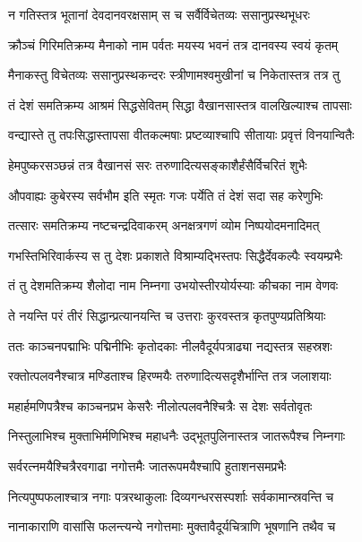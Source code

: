 \twolineshloka
{न गतिस्तत्र भूतानां देवदानवरक्षसाम्}
{स च सर्वैर्विचेतव्यः ससानुप्रस्थभूधरः} %

\twolineshloka
{क्रौञ्चं गिरिमतिक्रम्य मैनाको नाम पर्वतः}
{मयस्य भवनं तत्र दानवस्य स्वयं कृतम्} %

\twolineshloka
{मैनाकस्तु विचेतव्यः ससानुप्रस्थकन्दरः}
{स्त्रीणामश्वमुखीनां च निकेतास्तत्र तत्र तु} %

\twolineshloka
{तं देशं समतिक्रम्य आश्रमं सिद्धसेवितम्}
{सिद्धा वैखानसास्तत्र वालखिल्याश्च तापसाः} %

\twolineshloka
{वन्द्यास्ते तु तपःसिद्धास्तापसा वीतकल्मषाः}
{प्रष्टव्याश्चापि सीतायाः प्रवृत्तं विनयान्वितैः} %

\twolineshloka
{हेमपुष्करसञ्छन्नं तत्र वैखानसं सरः}
{तरुणादित्यसङ्काशैर्हंसैर्विचरितं शुभैः} %

\twolineshloka
{औपवाह्यः कुबेरस्य सर्वभौम इति स्मृतः}
{गजः पर्येति तं देशं सदा सह करेणुभिः} %

\twolineshloka
{तत्सारः समतिक्रम्य नष्टचन्द्रदिवाकरम्}
{अनक्षत्रगणं व्योम निष्पयोदमनादिमत्} %

\twolineshloka
{गभस्तिभिरिवार्कस्य स तु देशः प्रकाशते}
{विश्राम्यद्भिस्तपः सिद्धैर्देवकल्पैः स्वयम्प्रभैः} %

\twolineshloka
{तं तु देशमतिक्रम्य शैलोदा नाम निम्नगा}
{उभयोस्तीरयोर्यस्याः कीचका नाम वेणवः} %

\twolineshloka
{ते नयन्ति परं तीरं सिद्धान्प्रत्यानयन्ति च}
{उत्तराः कुरवस्तत्र कृतपुण्यप्रतिश्रियाः} %

\twolineshloka
{ततः काञ्चनपद्माभिः पद्मिनीभिः कृतोदकाः}
{नीलवैदूर्यपत्राढ्या नद्यस्तत्र सहस्रशः} %

\twolineshloka
{रक्तोत्पलवनैश्चात्र मण्डिताश्च हिरण्मयैः}
{तरुणादित्यसदृशैर्भान्ति तत्र जलाशयाः} %

\twolineshloka
{महार्हमणिपत्रैश्च काञ्चनप्रभ केसरैः}
{नीलोत्पलवनैश्चित्रैः स देशः सर्वतोवृतः} %

\twolineshloka
{निस्तुलाभिश्च मुक्ताभिर्मणिभिश्च महाधनैः}
{उद्भूतपुलिनास्तत्र जातरूपैश्च निम्नगाः} %

\twolineshloka
{सर्वरत्नमयैश्चित्रैरवगाढा नगोत्तमैः}
{जातरूपमयैश्चापि हुताशनसमप्रभैः} %

\twolineshloka
{नित्यपुष्पफलाश्चात्र नगाः पत्ररथाकुलाः}
{दिव्यगन्धरसस्पर्शाः सर्वकामान्स्रवन्ति च} %

\twolineshloka
{नानाकाराणि वासांसि फलन्त्यन्ये नगोत्तमाः}
{मुक्तावैदूर्यचित्राणि भूषणानि तथैव च} %

